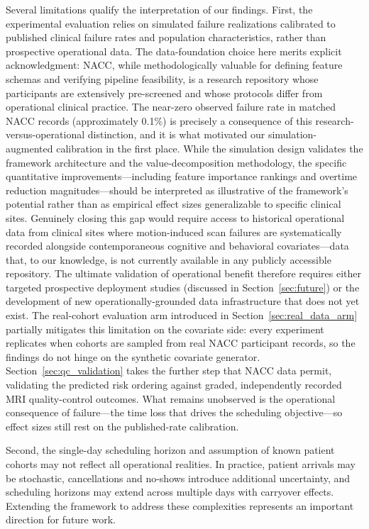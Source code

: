 \documentclass[11pt,a4paper]{article}
\newcommand{\rev}[1]{{\color{red}#1}}
\begin{document}
Several limitations qualify the interpretation of our findings. First, the experimental evaluation relies on simulated failure realizations calibrated to published clinical failure rates and population characteristics, rather than prospective operational data. The data-foundation choice here merits explicit acknowledgment: NACC, while methodologically valuable for defining feature schemas and verifying pipeline feasibility, is a research repository whose participants are extensively pre-screened and whose protocols differ from operational clinical practice. The near-zero observed failure rate in matched NACC records (approximately 0.1\%) is precisely a consequence of this research-versus-operational distinction, and it is what motivated our simulation-augmented calibration in the first place. While the simulation design validates the framework architecture and the value-decomposition methodology, the specific quantitative improvements---including feature importance rankings and overtime reduction magnitudes---should be interpreted as illustrative of the framework's potential rather than as empirical effect sizes generalizable to specific clinical sites. Genuinely closing this gap would require access to historical operational data from clinical sites where motion-induced scan failures are systematically recorded alongside contemporaneous cognitive and behavioral covariates---data that, to our knowledge, is not currently available in any publicly accessible repository. The ultimate validation of operational benefit therefore requires either targeted prospective deployment studies (discussed in Section~\ref{sec:future}) or the development of new operationally-grounded data infrastructure that does not yet exist. \rev{The real-cohort evaluation arm introduced in Section~\ref{sec:real_data_arm} partially mitigates this limitation on the covariate side: every experiment replicates when cohorts are sampled from real NACC participant records, so the findings do not hinge on the synthetic covariate generator. Section~\ref{sec:qc_validation} takes the further step that NACC data permit, validating the predicted risk ordering against graded, independently recorded MRI quality-control outcomes. What remains unobserved is the operational consequence of failure---the time loss that drives the scheduling objective---so effect sizes still rest on the published-rate calibration.}

Second, the single-day scheduling horizon and assumption of known patient cohorts may not reflect all operational realities. In practice, patient arrivals may be stochastic, cancellations and no-shows introduce additional uncertainty, and scheduling horizons may extend across multiple days with carryover effects. Extending the framework to address these complexities represents an important direction for future work.
\end{document}
